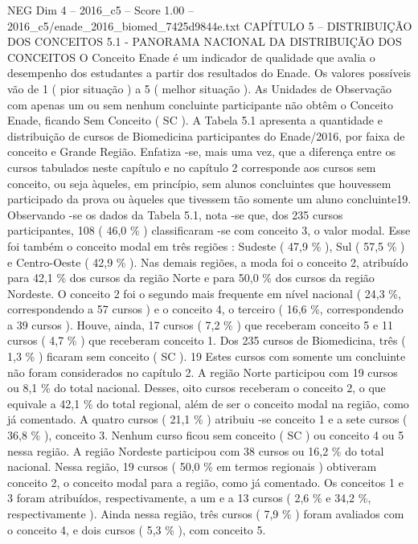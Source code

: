 \begin{textsample}{NEG Dim 4 – 2016\_c5 – Score 1.00 – 2016\_c5/enade\_2016\_biomed\_7425d9844e.txt}  \label{ex:f4_neg_253}
CAPÍTULO 5 – DISTRIBUIÇÃO DOS CONCEITOS 5.1 - PANORAMA NACIONAL DA DISTRIBUIÇÃO DOS CONCEITOS O Conceito Enade é um indicador de qualidade que avalia o desempenho dos estudantes a partir dos resultados do Enade.
Os valores possíveis vão de 1 ( pior situação ) a 5 ( melhor situação ).
As Unidades de Observação com apenas um ou sem nenhum concluinte participante não obtêm o Conceito Enade, ficando Sem Conceito ( SC ).
A Tabela 5.1 apresenta a quantidade e distribuição de cursos de Biomedicina participantes do Enade/2016, por faixa de conceito e Grande Região.
Enfatiza -se, mais uma vez, que a diferença entre os cursos tabulados neste capítulo e no capítulo 2 corresponde aos cursos sem conceito, ou seja àqueles, em princípio, sem alunos concluintes que houvessem participado da prova ou àqueles que tivessem tão somente um aluno concluinte19.
Observando -se os dados da Tabela 5.1, nota -se que, dos 235 cursos participantes, 108 ( 46,0 \% ) classificaram -se com conceito 3, o valor modal.
Esse foi também o conceito modal em três regiões : Sudeste ( 47,9 \% ), Sul ( 57,5 \% ) e Centro-Oeste ( 42,9 \% ).
Nas demais regiões, a moda foi o conceito 2, atribuído para 42,1 \% dos cursos da região Norte e para 50,0 \% dos cursos da região Nordeste.
O conceito 2 foi o segundo mais frequente em nível nacional ( 24,3 \%, correspondendo a 57 cursos ) e o conceito 4, o terceiro ( 16,6 \%, correspondendo a 39 cursos ).
Houve, ainda, 17 cursos ( 7,2 \% ) que receberam conceito 5 e 11 cursos ( 4,7 \% ) que receberam conceito 1.
Dos 235 cursos de Biomedicina, três ( 1,3 \% ) ficaram sem conceito ( SC ). 19 Estes cursos com somente um concluinte não foram considerados no capítulo 2.
A região Norte participou com 19 cursos ou 8,1 \% do total nacional.
Desses, oito cursos receberam o conceito 2, o que equivale a 42,1 \% do total regional, além de ser o conceito modal na região, como já comentado.
A quatro cursos ( 21,1 \% ) atribuiu -se conceito 1 e a sete cursos ( 36,8 \% ), conceito 3.
Nenhum curso ficou sem conceito ( SC ) ou conceito 4 ou 5 nessa região.
A região Nordeste participou com 38 cursos ou 16,2 \% do total nacional.
Nessa região, 19 cursos ( 50,0 \% em termos regionais ) obtiveram conceito 2, o conceito modal para a região, como já comentado.
Os conceitos 1 e 3 foram atribuídos, respectivamente, a um e a 13 cursos ( 2,6 \% e 34,2 \%, respectivamente ).
Ainda nessa região, três cursos ( 7,9 \% ) foram avaliados com o conceito 4, e dois cursos ( 5,3 \% ), com conceito 5.

\end{textsample}
